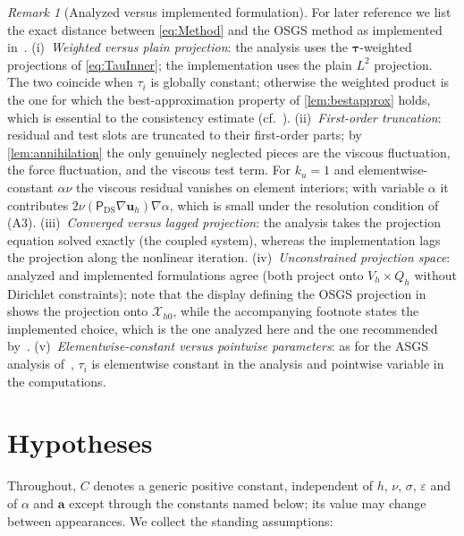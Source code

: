\documentclass[11pt]{article}
\theoremstyle{remark}
\newtheorem{remark}[theorem]{Remark}
\newcommand{\bu}{\boldsymbol{u}}
\newcommand{\ba}{\boldsymbol{a}}
\newcommand{\ViscProj}{\mathsf{P}_{\mathrm{DS}}}
\newcommand{\Xhz}{\mathcal{X}_{h0}}
\begin{document}
\begin{remark}[Analyzed versus implemented formulation]
\label{rem:analyzed}
For later reference we list the exact distance between \cref{eq:Method} and the OSGS
method as implemented in~\cite{companion}. (i)~\emph{Weighted versus plain projection}:
the analysis uses the $\boldsymbol{\tau}$-weighted projections of
\cref{eq:TauInner}; the implementation uses the plain $L^2$ projection. The two
coincide when $\tau_i$ is globally constant; otherwise the weighted product is the one
for which the best-approximation property of \cref{lem:bestapprox} holds, which is
essential to the consistency estimate (cf.~\cite[Remark~4]{Codina2008}).
(ii)~\emph{First-order truncation}: residual and test slots are truncated to their
first-order parts; by \cref{lem:annihilation} the only genuinely neglected pieces are
the viscous fluctuation, the force fluctuation, and the viscous test term. For $k_u = 1$
and elementwise-constant $\alpha\nu$ the viscous residual vanishes on element interiors;
with variable $\alpha$ it contributes $2\nu(\ViscProj\nabla\bu_h)\nabla\alpha$, which is
small under the resolution condition of (A3). (iii)~\emph{Converged versus lagged
projection}: the analysis takes the projection equation solved exactly (the coupled
system), whereas the implementation lags the projection along the nonlinear iteration.
(iv)~\emph{Unconstrained projection space}: analyzed and implemented formulations
agree (both project onto $V_h\times Q_h$ without Dirichlet constraints); note that the
display defining the OSGS projection in~\cite{companion} shows the projection onto
$\Xhz$, while the accompanying footnote states the implemented choice, which is the one
analyzed here and the one recommended by~\cite[Remark~1]{Codina2008}.
(v)~\emph{Elementwise-constant versus pointwise parameters}: as for the ASGS analysis
of~\cite{companion}, $\tau_{i}$ is elementwise constant in the analysis and pointwise
variable in the computations.
\end{remark}

\section{Hypotheses}
\label{sec:hypotheses}

Throughout, $C$ denotes a generic positive constant, independent of $h$, $\nu$,
$\sigma$, $\varepsilon$ and of $\alpha$ and $\ba$ except through the constants named
below; its value may change between appearances. We collect the standing assumptions:
\end{document}
